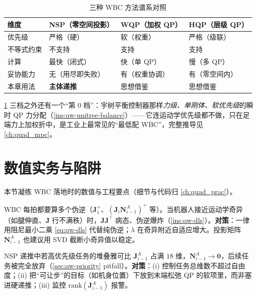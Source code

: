 \begin{table}[H]\centering\small
\caption{三种 WBC 方法谱系对照}
\begin{tabular}{p{} p{} p{} p{}}
\toprule
维度 & NSP（零空间投影）& WQP（加权 QP）& HQP（层级 QP）\\
\midrule
优先级 & 严格（硬）& 软（权重）& 严格（级联）\\
不等式约束 & 不支持 & 支持 & 支持 \\
计算 & 最快（闭式）& 快（单 QP）& 慢（多 QP）\\
妥协能力 & 无（用尽即失败）& 有（权重协调）& 有（零空间内）\\
本章用法 & \textbf{主体递推} & 思想借鉴 & 思想借鉴 \\
\bottomrule
\end{tabular}
\label{tab:qw-spectrum}
\end{table}

\noindent\cref{tab:qw-spectrum} 三档之外还有一个“第 $0$ 档”：宇树平衡控制器那样\emph{力级、单刚体、软优先级}的瞬时 QP 力分配（\cref{ins:qw-unitree-balance}）——它连运动学优先级都不做，只在足端力上加权折中，是工业上最常见的“最低配 WBC”，完整推导见 \cref{ch:quad_mpc}。

\section{数值实务与陷阱}
\label{sec:qw-practice}

本节凝练 WBC 落地时的数值与工程要点（细节与代码归 \cref{ch:quad_prac}）。

\begin{pitfall}
WBC 每拍都要算多个伪逆（$\boldsymbol{J}_1^+$、$(\boldsymbol{J}_i\boldsymbol{N}_{i-1}^A)^+$ 等）。当机器人接近运动学奇异（如腿伸直、$\boldsymbol{J}$ 行不满秩）时，$\boldsymbol{J}\boldsymbol{J}^\top$ 病态、伪逆爆炸（\cref{ins:qw-dls}）。\textbf{对策}：一律用阻尼最小二乘 \cref{eq:qw-dls} 代替纯伪逆；$\lambda$ 在奇异附近自适应增大。投影矩阵 $\boldsymbol{N}_{i-1}^A$ 也建议用 SVD 截断小奇异值以稳定。
\end{pitfall}

\begin{pitfall}
NSP 递推中若高优先级任务的堆叠雅可比 $\boldsymbol{J}_{i-1}^A$ 占满 $18$ 维，$\boldsymbol{N}_{i-1}^A\to\mathbf{0}$，后续任务被完全放弃（\cref{sec:qw-priority} pitfall）。\textbf{对策}：(i) 控制任务总维数不超过自由度；(ii) 把“可让步”的目标（如机身位置）下放到末端松弛 QP 的软项里，而非塞进硬递推；(iii) 监控 $\mathrm{rank}(\boldsymbol{J}_{i-1}^A)$ 报警。
\end{pitfall}

